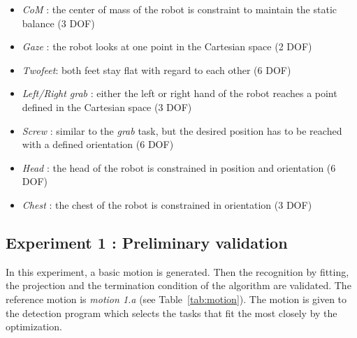 \documentclass[journal]{IEEEtran}
\begin{document}
\begin{itemize}
  \item \emph{CoM} : the center of mass of the robot is constraint to maintain the static balance (3 DOF)
  \item \emph{Gaze} : the robot looks at one point in the Cartesian space (2 DOF)
  \item \emph{Twofeet}: both feet stay flat with regard to each other (6 DOF)
  \item \emph{Left/Right grab} : either the left or right hand
of the robot reaches a point defined in the Cartesian space (3 DOF)
  \item \emph{Screw} : similar to the \emph{grab} task, but the desired position
has to be reached with a defined orientation (6 DOF)
  \item \emph{Head} : the head of the robot is constrained in position and orientation (6 DOF)
  \item \emph{Chest} : the chest of the robot is constrained in orientation  (3 DOF)
\end{itemize}

\subsection{Experiment 1 : Preliminary validation}
\label{sec:prelimValid}
In this experiment, a basic motion is generated. Then the recognition by fitting, the projection
and the termination condition of the algorithm are validated.
The reference motion is \emph{motion 1.a} (see Table~\ref{tab:motion}).
The motion is given to the detection program
which selects the tasks that fit the most closely by the optimization.
\end{document}
